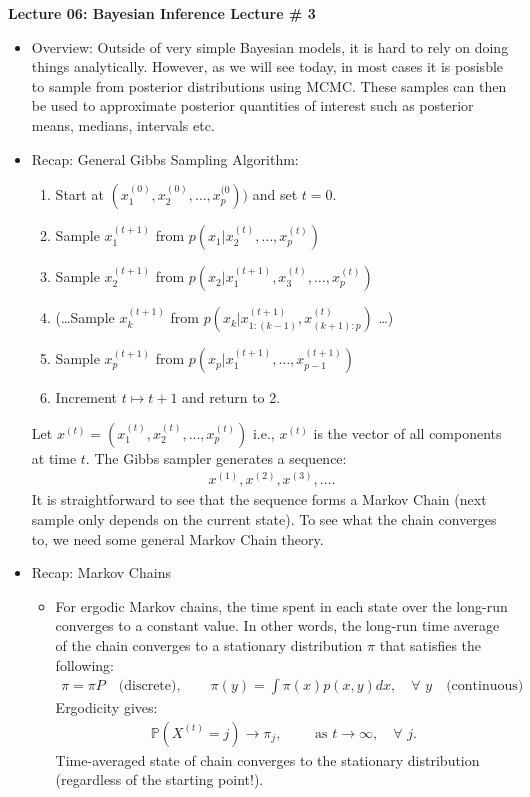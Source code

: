 \documentclass[11pt]{article}
\def\Pr{\mathbb{P}}
\begin{document}
\textbf{Lecture 06: Bayesian Inference Lecture \# 3}

\begin{itemize}

\item Overview: Outside of very simple Bayesian models, it is hard to rely on doing things analytically. However, as we will see today, in most cases it is posisble to sample from posterior distributions using MCMC. These samples can then be used to approximate posterior quantities of interest such as posterior means, medians, intervals etc.

\item  Recap: General Gibbs Sampling Algorithm:
\begin{enumerate}
    \item Start at $(x_{1}^{(0)},x_{2}^{(0)},\ldots,x_{p}^{(0}))$ and set $t=0$.
    \item Sample $x_{1}^{(t+1)}$ from $p(x_{1}|x_{2}^{(t)},\ldots,x_{p}^{(t)})$
    \item Sample $x_{2}^{(t+1)}$ from $p(x_{2}|x_{1}^{(t+1)},x_{3}^{(t)},\ldots,x_{p}^{(t)})$
    \item (\ldots Sample $x_{k}^{(t+1)}$ from $p(x_{k}|x_{1:(k-1)}^{(t+1)},x_{(k+1):p}^{(t)})$ \ldots)
    \item Sample $x_{p}^{(t+1)}$ from $p(x_{p}|x_{1}^{(t+1)},\ldots,x_{p-1}^{(t+1)})$
    \item Increment $t\mapsto{}t+1$ and return to 2.
\end{enumerate}
Let $x^{(t)}=(x_{1}^{(t)},x_{2}^{(t)},\ldots,x_{p}^{(t)})$ i.e., $x^{(t)}$ is the vector of all components at time $t$. The Gibbs sampler generates a sequence:
\begin{align*}
 x^{(1)}, x^{(2)}, x^{(3)}, \ldots .
\end{align*}
 It is straightforward to see that the sequence forms a Markov Chain (next sample only depends on the current state). To see what the chain converges to, we need some general Markov Chain theory.
 
\item Recap: Markov Chains
\begin{itemize}
    \item For ergodic Markov chains, the time spent in each state over the long-run converges to a constant value. In other words, the long-run time average of the chain converges to a stationary distribution $\pi$ that satisfies the following:
    \begin{align*}
     \pi = \pi P \quad \textrm{(discrete)} , \qquad \pi(y) = \int \pi(x) p(x,y) dx , \quad \forall\,\, y \quad \textrm{(continuous)}
    \end{align*}
    Ergodicity gives:
    \begin{align*}
    \Pr(X^{(t)}=j) \longrightarrow \pi_{j} , \qquad \textrm{ as } t \rightarrow \infty, \quad \forall{}\,\,  j .
    \end{align*}
    Time-averaged state of chain converges to the stationary distribution (regardless of the starting point!). 
\end{itemize}


\end{itemize}
\end{document}
